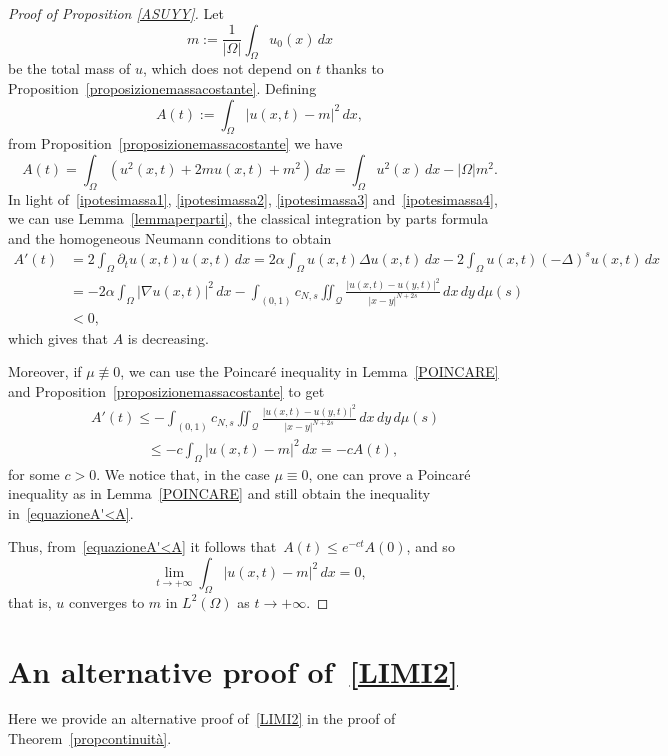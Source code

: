 \documentclass[12pt,a4paper,intlimits,sumlimits]{amsart}
\def \Q {\mathcal Q}
\theoremstyle{definition}
\theoremstyle{plain}
\numberwithin{equation}{section}
\renewcommand{\leq}{\leqslant}
\begin{document}
\begin{appendix}
\begin{proof}[Proof of Proposition \ref{ASUYY}]
Let 
\[
m:=\frac{1}{|\Omega|}\int_\Omega u_0(x)\,dx
\]
be the total mass of $u$, which does not depend on $t$ thanks to 
Proposition~\ref{proposizionemassacostante}.
Defining 
\[
A(t):=\int_\Omega |u(x,t)-m|^2\,dx,
\]
from Proposition~\ref{proposizionemassacostante} we have
\[
A(t)=\int_\Omega (u^2(x,t)+2mu(x,t)+m^2)\,dx=
\int_\Omega u^2(x)\,dx -|\Omega|m^2.
\]
In light of~\eqref{ipotesimassa1}, \eqref{ipotesimassa2},
\eqref{ipotesimassa3} and~\eqref{ipotesimassa4}, we can use 
Lemma~\ref{lemmaperparti}, the classical integration by parts formula and the homogeneous Neumann conditions to obtain
\[
\begin{aligned}
A'(t)&=2\int_\Omega \partial_t u(x,t)u(x,t)\,dx
=2 \alpha\int_\Omega u(x,t) \Delta u(x,t)\,dx
-2 \int_\Omega u(x,t) (-\Delta)^s u(x,t)\,dx \\
&=-2 \alpha\int_\Omega |\nabla u(x,t)|^2 \,dx
-\int_{(0,1)}c_{N,s}
\iint_\Q \frac{|u(x,t)-u(y,t)|^2}{|x-y|^{N+2s}}\,dx\,dy\,d\mu(s)\\
&<0,
\end{aligned}
\]
which gives that $A$ is decreasing.

Moreover, if $\mu\not \equiv 0$, we can use the Poincar\'e
inequality in Lemma~\ref{POINCARE} and Proposition~\ref{proposizionemassacostante} to get
\begin{equation}\label{equazioneA'<A}\begin{split}&
A'(t) \leq -\int_{(0,1)}c_{N,s}
\iint_\Q \frac{|u(x,t)-u(y,t)|^2}{|x-y|^{N+2s}}\,dx\,dy\,d\mu(s)\\&\qquad\qquad
\leq -c\int_\Omega |u(x,t)-m|^2\,dx=-cA(t),\end{split}
\end{equation}
for some $c>0$. We notice that, in the case $\mu\equiv 0$,
one can prove a Poincar\'e inequality as in Lemma~\ref{POINCARE} 
and still obtain the inequality in~\eqref{equazioneA'<A}.

Thus, from~\eqref{equazioneA'<A} it follows that~$
A(t)\leq e^{-ct}A(0)$,
and so
\[
\lim_{t\to +\infty} \int_\Omega |u(x,t)-m|^2\,dx=0,
\]
that is, $u$ converges to $m$ in $L^2(\Omega)$ as $t\to +\infty$.
\end{proof}


\section{An alternative proof of~\eqref{LIMI2}}\label{KDMCLDFMVV4}
Here we provide an alternative proof of~\eqref{LIMI2} in the proof of Theorem~\ref{propcontinuità}.


\end{appendix}
\end{document}
